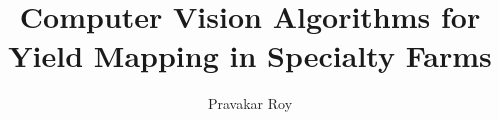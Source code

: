 

\phd %

%
\title{\bf Computer Vision Algorithms for Yield Mapping in Specialty Farms}
\author{Pravakar Roy}


\abstract{}


\acknowledgements{}
\dedication{}


\beforepreface

\figurespage
\tablespage

\afterpreface
